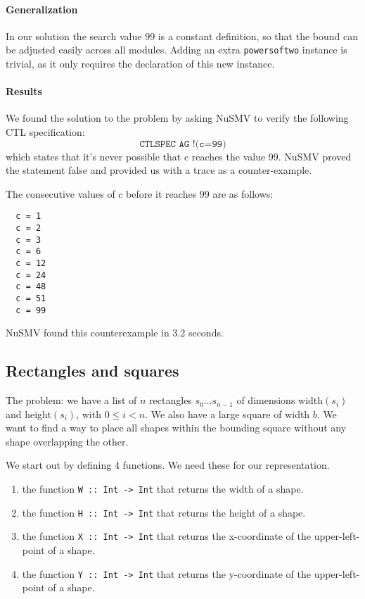\documentclass[12pt]{article}
\begin{document}
\paragraph{Generalization}
In our solution the search value $99$ is a constant definition, so that the bound can be adjusted easily across all modules.
Adding an extra \texttt{powersoftwo} instance is trivial, as it only requires the declaration of this new instance.

\paragraph{Results}
We found the solution to the problem by asking NuSMV 
to verify the following CTL specification:
\[\texttt{CTLSPEC AG !(c=99)}\]
which states that it's never possible that c reaches the value 99.
NuSMV proved the statement false and 
provided us with a trace as a counter-example.

The consecutive values of $c$ before it reaches $99$ are as follows:
\begin{verbatim}
  c = 1
  c = 2
  c = 3
  c = 6
  c = 12
  c = 24
  c = 48
  c = 51
  c = 99
\end{verbatim}

NuSMV found this counterexample in 3.2 seconds.

\clearpage

\subsection*{Rectangles and squares}
The problem: we have a list of $n$ rectangles 
$s_0\dots s_{n-1}$ of dimensions width$(s_i)$ and height$(s_i)$, with $0 \le i <n$. %
We also have a large square of width $b$.%
We want to find a way to place all shapes within the bounding square 
without any shape overlapping the other.

We start out by defining 4 functions. 
We need these for our representation.

\begin{enumerate}
\item the function \texttt{W :: Int -> Int} that returns the width of a shape.
\item the function \texttt{H :: Int -> Int}  that returns the height of a shape.
\item the function \texttt{X :: Int -> Int} that returns the x-coordinate of the upper-left-point of a shape.
\item the function \texttt{Y :: Int -> Int} that returns the y-coordinate of the upper-left-point of a shape.
\end{enumerate}
\end{document}
